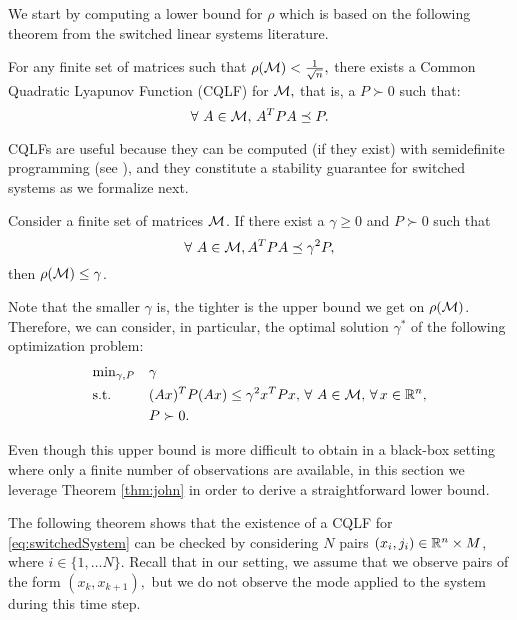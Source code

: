 We start by computing a lower bound for $\rho$ which is based on the following theorem from the switched linear systems literature.
\begin{theorem}\cite[Theorem 2.11]{jungers_lncis}\label{thm:john}
For any finite set of matrices such that $\rho(\mathcal{M})<\frac{1}{\sqrt{n}},$ there exists a Common Quadratic Lyapunov Function (CQLF) for $\mathcal{M},$ that is, a $P\succ 0$ such that: $$\forall\ A\in \mathcal{M},\, A^TPA\preceq P. $$
\end{theorem}

CQLFs are useful because they can be computed (if they exist) with semidefinite programming (see \cite{boyd}), and they constitute a stability guarantee for switched systems as we formalize next.\begin{theorem}\cite[Prop. 2.8]{jungers_lncis}\label{thm:cqlf} Consider a finite set of matrices $\mathcal{M}$. If there exist a $\gamma \geq 0$ and $P \succ 0$ such that $$\forall\ A \in \mathcal{M}, A^TPA \preceq \gamma^2P,$$ then $\rho(\mathcal{M}) \leq \gamma$.
\end{theorem}
Note that the smaller $\gamma$ is, the tighter is the upper bound we get on $\rho(\mathcal{M})$. Therefore, we can consider, in particular, the optimal solution $\gamma^*$ of the following optimization problem:
\begin{equation}\label{eqn:campiOpt0}
\begin{aligned}
& \text{min}_{\gamma, P} & & \gamma \\
& \text{s.t.} 
&  & (Ax)^TP(Ax) \leq \gamma^2 x^TPx,\,\forall\ A \in \mathcal{M}, \,\forall\, x \in \mathbb{R}^n,\\
& && P \succ 0. \\
\end{aligned}
\end{equation}

Even though this upper bound is more difficult to obtain in a black-box setting where only a finite number of observations are available, in this section we leverage Theorem \ref{thm:john} in order to derive a straightforward lower bound.

The following theorem shows that the existence of a CQLF for \eqref{eq:switchedSystem} can be checked by considering $N$ pairs $(x_i, j_i) \in \mathbb{R}^n \times M$, where $i \in \{1, \ldots N\}.$ Recall that in our setting, we assume that we observe pairs of the form $(x_k,x_{k+1}),$ but we do not observe the mode applied to the system during this time step.
%

